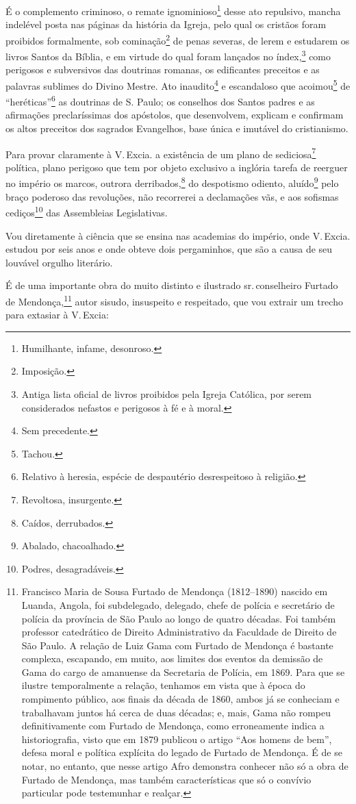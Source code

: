 É o complemento criminoso, o remate ignominioso\footnote{Humilhante,
  infame, desonroso.} desse ato repulsivo, mancha indelével posta nas
páginas da história da Igreja, pelo qual os cristãos foram proibidos
formalmente, sob cominação\footnote{Imposição.} de penas severas, de
lerem e estudarem os livros Santos da Bíblia, e em virtude do qual foram
lançados no índex,\footnote{Antiga lista oficial de livros proibidos
  pela Igreja Católica, por serem considerados nefastos e perigosos à fé
  e à moral.} como perigosos e subversivos das doutrinas romanas, os
edificantes preceitos e as palavras sublimes do Divino Mestre. Ato
inaudito\footnote{Sem precedente.} e escandaloso que
acoimou\footnote{Tachou.} de ``heréticas''\footnote{Relativo à heresia,
  espécie de despautério desrespeitoso à religião.} as doutrinas de S.
Paulo; os conselhos dos Santos padres e as afirmações preclaríssimas dos
apóstolos, que desenvolvem, explicam e confirmam os altos preceitos dos
sagrados Evangelhos, base única e imutável do cristianismo.

Para provar claramente à V.\,Excia. a existência de um plano de
sediciosa\footnote{Revoltosa, insurgente.} política, plano perigoso
que tem por objeto exclusivo a inglória tarefa de reerguer no império os
marcos, outrora derribados,\footnote{Caídos, derrubados.} do
despotismo odiento, aluído\footnote{Abalado, chacoalhado.} pelo braço
poderoso das revoluções, não recorrerei a declamações vãs, e aos
sofismas cediços\footnote{Podres, desagradáveis.} das Assembleias
Legislativas.

Vou diretamente à ciência que se ensina nas academias do império, onde
V.\,Excia. estudou por seis anos e onde obteve dois pergaminhos, que são
a causa de seu louvável orgulho literário.

É de uma importante obra do muito distinto e ilustrado sr.\,conselheiro
Furtado de Mendonça,\footnote{Francisco Maria de Sousa Furtado de
  Mendonça (1812--1890) nascido em Luanda, Angola, foi subdelegado,
  delegado, chefe de polícia e secretário de polícia da província de São
  Paulo ao longo de quatro décadas. Foi também professor catedrático
  de Direito Administrativo da Faculdade de Direito de São Paulo. A
  relação de Luiz Gama com Furtado de Mendonça é bastante complexa,
  escapando, em muito, aos limites dos eventos da demissão de Gama do
  cargo de amanuense da Secretaria de Polícia, em 1869. Para que se
  ilustre temporalmente a relação, tenhamos em vista que à época do
  rompimento público, aos finais da década de 1860, ambos já se
  conheciam e trabalhavam juntos há cerca de duas décadas; e, mais, Gama
  não rompeu definitivamente com Furtado de Mendonça, como erroneamente
  indica a historiografia, visto que em 1879 publicou o artigo ``Aos
  homens de bem'', defesa moral e política explícita do legado de Furtado
  de Mendonça. É de se notar, no entanto, que nesse artigo Afro
  demonstra conhecer não só a obra de Furtado de Mendonça, mas também
  características que só o convívio particular pode testemunhar e
  realçar.} autor sisudo, insuspeito e respeitado, que vou extrair um
trecho para extasiar à V.\,Excia:

